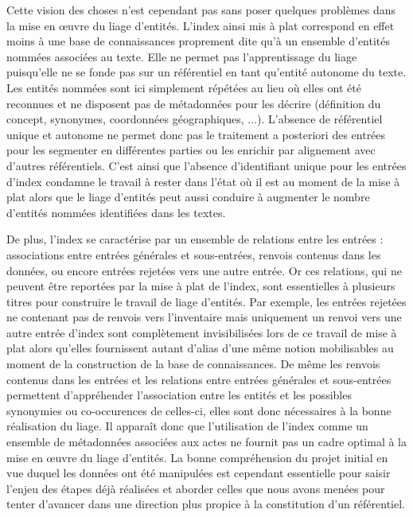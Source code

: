 \documentclass[a4paper,12pt,twoside]{book}
\begin{document}
	Cette vision des choses n'est cependant pas sans poser quelques problèmes dans la mise en œuvre du liage d'entités. L'index ainsi mis à plat correspond en effet moins à une base de connaissances proprement dite qu'à un ensemble d'entités nommées associées au texte. Elle ne permet pas l'apprentissage du liage puisqu'elle ne se fonde pas sur un référentiel en tant qu'entité autonome du texte. Les entités nommées sont ici simplement répétées au lieu où elles ont été reconnues et ne disposent pas de métadonnées pour les décrire (définition du concept, synonymes, coordonnées géographiques, ...). L'absence de référentiel unique et autonome ne permet donc pas le traitement a posteriori des entrées pour les segmenter en différentes parties ou les enrichir par alignement avec d'autres référentiels. C'est ainsi que l'absence d'identifiant unique pour les entrées d'index condamne le travail à rester dans l'état où il est au moment de la mise à plat alors que le liage d'entités peut aussi conduire à augmenter le nombre d'entités nommées identifiées dans les textes.
	
	De plus, l'index se caractérise par un ensemble de relations entre les entrées : associations entre entrées générales et sous-entrées, renvois contenus dans les données, ou encore entrées rejetées vers une autre entrée. Or ces relations, qui ne peuvent être reportées par la mise à plat de l'index, sont essentielles à plusieurs titres pour construire le travail de liage d'entités.  Par exemple, les entrées rejetées ne contenant pas de renvois vers l'inventaire mais uniquement un renvoi vers une autre entrée d'index sont complètement invisibilisées lors de ce travail de mise à plat alors qu'elles fournissent autant d'alias d'une même notion mobilisables au moment de la construction de la base de connaissances. De même les renvois contenus dans les entrées et les relations entre entrées générales et sous-entrées permettent d'appréhender l'association entre les entités et les possibles synonymies ou co-occurences de celles-ci, elles sont donc nécessaires à la bonne réalisation du liage. Il apparaît donc que l'utilisation de l'index comme un ensemble de métadonnées associées aux actes ne fournit pas un cadre optimal à la mise en œuvre du liage d'entités. La bonne compréhension du projet initial en vue duquel les données ont été manipulées est cependant essentielle pour saisir l'enjeu des étapes déjà réalisées et aborder celles que nous avons menées pour tenter d'avancer dans une direction plus propice à la constitution d'un référentiel.
	
\end{document}
